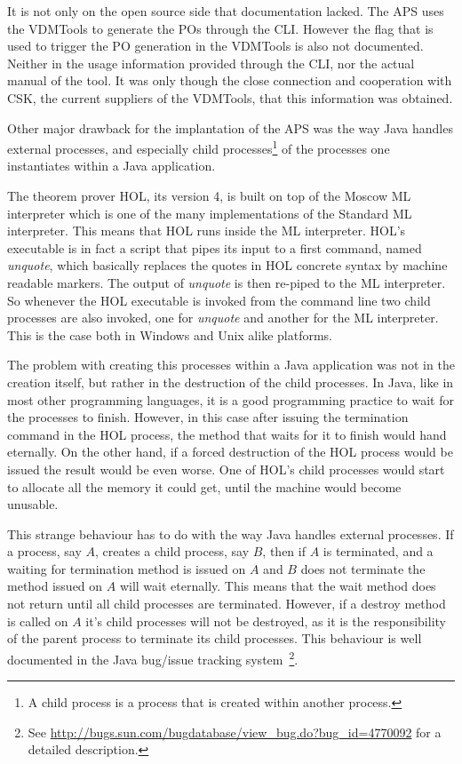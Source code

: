 \documentclass[]{article}
\begin{document}
It is not only on the open source side that documentation lacked. 
The APS uses the VDMTools to generate the POs through the CLI.
However the flag that is used to trigger the PO generation in the VDMTools is also not documented.
Neither in the usage information provided through the CLI, nor the actual manual of the tool.
It was only though the close connection and cooperation with CSK, the current suppliers of the VDMTools, that this information was obtained.

Other major drawback for the implantation of the APS was the way Java handles external processes, and especially child processes\footnote{A child process is a process that is created within another process.} of the processes one instantiates within a Java application.

The theorem prover HOL, its version 4, is built on top of the Moscow ML interpreter which is one of the many implementations of the Standard ML interpreter.
This means that HOL runs inside the ML interpreter.
HOL's executable is in fact a script that pipes its input to a first command, named \emph{unquote}, which basically replaces the quotes in HOL concrete syntax by machine readable markers.
The output of \emph{unquote} is then re-piped to the ML interpreter.
So whenever the HOL executable is invoked from the command line two child processes are also invoked, one for \emph{unquote} and another for the ML interpreter.
This is the case both in Windows and Unix alike platforms.

The problem with creating this processes within a Java application was not in the creation itself, but rather in the destruction of the child processes.
In Java, like in most other programming languages, it is a good programming practice to wait for the processes to finish.
However, in this case after issuing the termination command in the HOL process, the method that waits for it to finish would hand eternally.
On the other hand, if a forced destruction of the HOL process would be issued the result would be even worse.
One of HOL's child processes would start to allocate all the memory it could get, until the machine would become unusable.

This strange behaviour has to do with the way Java handles external processes.
If a process, say $A$, creates a child process, say $B$, then if $A$ is terminated, and a waiting for termination method is issued on $A$ and $B$ does not terminate the method issued on $A$ will wait eternally.
This means that the wait method does not return until all child processes are terminated.
However, if a destroy method is called on $A$ it's child processes will not be destroyed, as it is the responsibility of the parent process to terminate its child processes.
This behaviour is well documented in the Java bug/issue tracking system~\footnote{See \url{http://bugs.sun.com/bugdatabase/view\_bug.do?bug\_id=4770092} for a detailed description.}.
\end{document}
